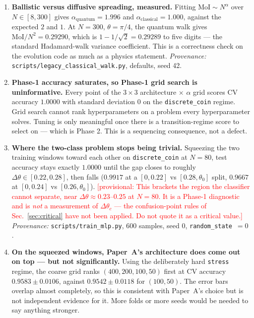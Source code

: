 \documentclass[11pt]{article}
\newcommand{\dtheta}{\Delta\theta}                  %
\newcommand{\dthetac}{\Delta\theta_{c}}             %
\newcommand{\MoI}{\mathrm{MoI}}
\newcommand{\provisional}[1]{\textcolor{red}{[provisional: #1]}}
\begin{document}
\begin{enumerate}

\item \textbf{Ballistic versus diffusive spreading, measured.}
Fitting $\MoI \sim N^{\alpha}$ over $N \in [8,300]$ gives
$\alpha_{\mathrm{quantum}} = 1.996$ and $\alpha_{\mathrm{classical}} = 1.000$,
against the expected $2$ and $1$. At $N=300$, $\theta=\pi/4$, the quantum
walk gives $\MoI/N^{2} = 0.29290$, which is $1-1/\sqrt{2} = 0.29289$ to five
digits --- the standard Hadamard-walk variance coefficient. This is a
correctness check on the evolution code as much as a physics statement.
\emph{Provenance:} \texttt{scripts/legacy\_classical\_walk.py}, defaults,
seed 42.

\item \textbf{Phase-1 accuracy saturates, so Phase-1 grid search is
uninformative.}
Every point of the $3\times 3$ architecture $\times$ $\alpha$ grid scores CV
accuracy $1.0000$ with standard deviation $0$ on the \texttt{discrete\_coin}
regime. Grid search cannot rank hyperparameters on a problem every
hyperparameter solves. Tuning is only meaningful once there is a
transition-regime score to select on --- which is Phase 2. This is a
sequencing consequence, not a defect.

\item \textbf{Where the two-class problem stops being trivial.}
Squeezing the two training windows toward each other on
\texttt{discrete\_coin} at $N=80$, test accuracy stays exactly $1.0000$ until
the gap closes to roughly $\dtheta \in [0.22, 0.28]$, then falls
($0.9917$ at a $[0,0.22]$ vs $[0.28,\theta_0]$ split, $0.9667$ at
$[0,0.24]$ vs $[0.26,\theta_0]$).
\provisional{This brackets the region the classifier cannot separate, near
$\dtheta \approx 0.23$--$0.25$ at $N=80$. It is a Phase-1 diagnostic and is
\emph{not} a measurement of $\dthetac$ --- the confusion-point rules of
Sec.~\ref{sec:critical} have not been applied. Do not quote it as a critical
value.}
\emph{Provenance:} \texttt{scripts/train\_mlp.py}, 600 samples, seed 0,
\texttt{random\_state}~$=0$.

\item \textbf{On the squeezed windows, Paper~A's architecture does come out
on top --- but not significantly.}
Using the deliberately hard \texttt{stress} regime, the coarse grid ranks
$(400,200,100,50)$ first at CV accuracy $0.9583 \pm 0.0106$, against
$0.9542 \pm 0.0118$ for $(100,50)$. The error bars overlap almost completely,
so this is consistent with Paper~A's choice but is not independent evidence
for it. More folds or more seeds would be needed to say anything stronger.


\end{enumerate}
\end{document}

